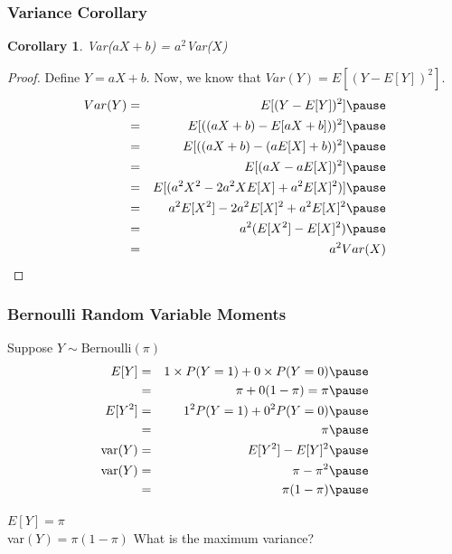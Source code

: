 \documentclass{beamer}
\newtheorem{cor}{Corollary}
\numberwithin{equation}{section}
\begin{document}
\begin{frame}
\frametitle{Variance Corollary} 

\begin{cor}
Var($aX  + b$)  = $a^2$Var($X$) 
\end{cor} 
\pause 
\begin{proof} 
Define $Y = aX +b$.  Now, we know that $Var(Y) = E[(Y - E[Y])^2]$. \pause 
\begin{eqnarray}
Var(Y) & =& E[ (Y - E[Y])^2 ] \nonumber  \pause \\
& =& E[ ((aX + b) - E[a X + b]))^2 ] \nonumber  \pause \\
& =& E[ ((aX + b) - (a E[X] + b))^2 ] \nonumber  \pause \\
& =& E[ (aX -a E[X] )^2 ] \nonumber  \pause \\
 & = & E[ (a^2 X^2 - 2 a^2 X E[X] + a^2 E[X]^2)] \nonumber  \pause \\
& = & a^2E[X^2] -2a^2E[X]^2 + a^2 E[X]^2 \nonumber  \pause \\
& = & a^2(E[X^2] - E[X]^2) \nonumber \pause  \\
 & = & a^2 Var(X) \nonumber 
 \end{eqnarray}
\end{proof} 

\end{frame}


\begin{frame}
\frametitle{Bernoulli Random Variable \alert{Moments}}
Suppose $Y \sim \text{Bernoulli}(\pi)$ \\


\begin{eqnarray} 
E[Y] & = & 1 \times P(Y = 1) + 0 \times P(Y = 0) \pause \nonumber \\
& = & \pi + 0 (1 - \pi) \nonumber  = \pi \pause \nonumber \\
E[Y^2] & = & 1^{2} P(Y = 1) + 0^{2} P(Y = 0) \nonumber \pause\\
& = & \pi \nonumber\pause\\ 
\text{var}(Y) & = & E[Y^2] - E[Y]^2 \nonumber  \pause\\
\text{var}(Y) & = & \pi - \pi^{2} \nonumber\pause \\
& = & \pi(1 - \pi ) \nonumber \pause
\end{eqnarray}

$E[Y] = \pi$\\
var$(Y) = \pi(1- \pi) $
What is the maximum variance?



\end{frame}
\end{document}
